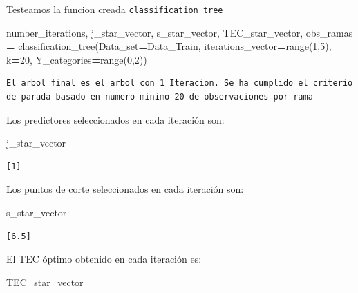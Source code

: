 \documentclass[
  11pt,
  a4paper,
]{article}
\newenvironment{Shaded}{\begin{snugshade}}{\end{snugshade}}
\newcommand{\BuiltInTok}[1]{#1}
\newcommand{\DecValTok}[1]{\textcolor[rgb]{0.00,0.00,0.81}{#1}}
\newcommand{\NormalTok}[1]{#1}
\newcommand{\OperatorTok}[1]{\textcolor[rgb]{0.81,0.36,0.00}{\textbf{#1}}}
\begin{document}
Testeamos la funcion creada \texttt{classification\_tree}

\begin{Shaded}
\begin{Highlighting}[]
\NormalTok{number\_iterations, j\_star\_vector, s\_star\_vector, TEC\_star\_vector, obs\_ramas }\OperatorTok{=}\NormalTok{ classification\_tree(Data\_set}\OperatorTok{=}\NormalTok{Data\_Train, iterations\_vector}\OperatorTok{=}\BuiltInTok{range}\NormalTok{(}\DecValTok{1}\NormalTok{,}\DecValTok{5}\NormalTok{), k}\OperatorTok{=}\DecValTok{20}\NormalTok{, Y\_categories}\OperatorTok{=}\BuiltInTok{range}\NormalTok{(}\DecValTok{0}\NormalTok{,}\DecValTok{2}\NormalTok{))}
\end{Highlighting}
\end{Shaded}

\begin{verbatim}
El arbol final es el arbol con 1 Iteracion. Se ha cumplido el criterio de parada basado en numero minimo 20 de observaciones por rama
\end{verbatim}

Los predictores seleccionados en cada iteración son:

\begin{Shaded}
\begin{Highlighting}[]
\NormalTok{j\_star\_vector}
\end{Highlighting}
\end{Shaded}

\begin{verbatim}
[1]
\end{verbatim}

Los puntos de corte seleccionados en cada iteración son:

\begin{Shaded}
\begin{Highlighting}[]
\NormalTok{s\_star\_vector}
\end{Highlighting}
\end{Shaded}

\begin{verbatim}
[6.5]
\end{verbatim}

El TEC óptimo obtenido en cada iteración es:

\begin{Shaded}
\begin{Highlighting}[]
\NormalTok{TEC\_star\_vector}
\end{Highlighting}
\end{Shaded}
\end{document}
